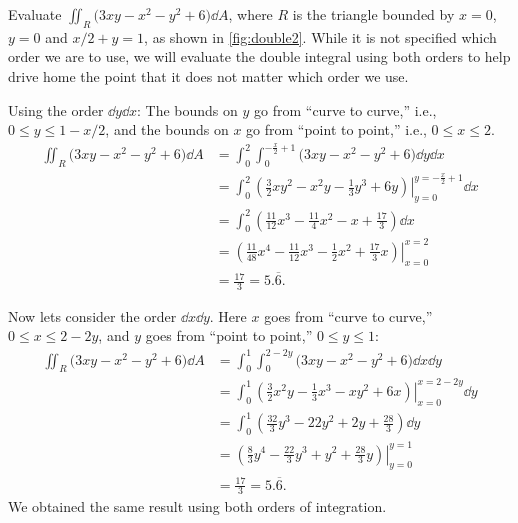 \begin{example}\label{ex_double2}
Evaluate $\iint_R \bigl(3xy-x^2-y^2+6\bigr)\dd A$, where $R$ is the triangle bounded by $x=0$, $y=0$ and $x/2+y=1$, as shown in \autoref{fig:double2}.
\solution
While it is not specified which order we are to use, we will evaluate the double integral using both orders to help drive home the point that it does not matter which order we use.


Using the order $\dd y\dd x$:
The bounds on $y$ go from ``curve to curve,'' i.e., $0\leq y\leq 1-x/2$, and the bounds on $x$ go from ``point to point,'' i.e., $0\leq x\leq 2$.
\begin{align*}
\iint_R (3xy-x^2-y^2+6\bigl)\dd A &= \int_0^2\int_0^{-\frac x2+1} (3xy-x^2-y^2+6\bigr)\dd y\dd x\\
		&= \int_0^2\left.\left(\frac32xy^2-x^2y-\frac13y^3+6y\right)\right|_{y=0}^{y=-\frac x2+1}\dd x\\
		&= \int_0^2 \left(\frac{11}{12}x^3-\frac{11}{4}x^2-x+\frac{17}3\right)\dd x \\
		&= \left.\left(\frac{11}{48}x^4-\frac{11}{12}x^3-\frac12x^2+\frac{17}3x\right)\right|_{x=0}^{x=2}\\
		&= \frac{17}3=5.\overline{6}.
\end{align*}

Now lets consider the order $\dd x \dd y$. Here $x$ goes from ``curve to curve,'' $0\leq x\leq 2-2y$, and $y$ goes from ``point to point,'' $0\leq y\leq 1$:
{\allowdisplaybreaks
\begin{align*}
\iint_R \bigl(3xy-x^2-y^2+6\bigr)\dd A
	&= \int_0^1\int_0^{2-2y} \bigl(3xy-x^2-y^2+6\bigr)\dd x\dd y\\
	&= \int_0^1\left.\left(\frac32x^2y-\frac13x^3-xy^2+6x\right)\right|_{x=0}^{x=2-2y}\dd y\\
	&= \int_0^1\left(\frac{32}3y^3-22y^2+2y+\frac{28}3\right)\dd y\\
	&=\left.\left(\frac83y^4-\frac{22}3y^3+y^2+\frac{28}3y\right)\right|_{y=0}^{y=1}\\
	&=\frac{17}3=5.\overline{6}.
\end{align*}}
We obtained the same result using both orders of integration.
\end{example}

